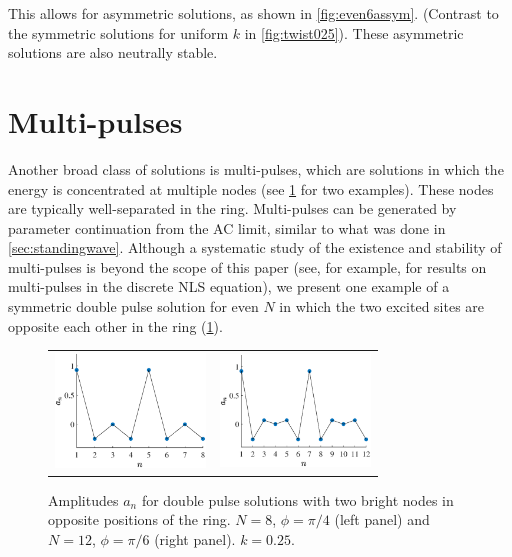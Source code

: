\documentclass[reprint, amsmath,amssymb,aps]{revtex4-2}
\def\noi{\noindent}
\begin{document}
\noi This allows for asymmetric solutions, as shown in \cref{fig:even6assym}. (Contrast to the symmetric solutions for uniform $k$ in \cref{fig:twist025}). These asymmetric solutions are also neutrally stable.

\section{Multi-pulses}

Another broad class of solutions is multi-pulses, which are solutions in which the energy is concentrated at multiple nodes (see \cref{fig:dp} for two examples). These nodes are typically well-separated in the ring. Multi-pulses can be generated by parameter continuation from the AC limit, similar to what was done in \cref{sec:standingwave}. Although a systematic study of the existence and stability of multi-pulses is beyond the scope of this paper (see, for example, \cite{Parker2020} for results on multi-pulses in the discrete NLS equation), we present one example of a symmetric double pulse solution for even $N$ in which the two excited sites are opposite each other in the ring (\cref{fig:dp}). 

\begin{figure}
\begin{center}
\begin{tabular}{cc}
\includegraphics[width=4cm]{dp8pi4} &
\includegraphics[width=4cm]{dp12pi6}
\end{tabular}
\end{center}
\caption{Amplitudes $a_n$ for double pulse solutions with two bright nodes in opposite positions of the ring. $N=8$, $\phi=\pi/4$ (left panel) and $N=12$, $\phi=\pi/6$ (right panel). $k=0.25$.}
\label{fig:dp}
\end{figure}
\end{document}
